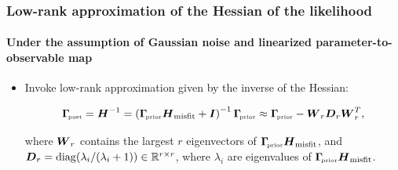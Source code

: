 \documentclass[10pt,final,xcolor=dvipsnames]{beamer}
\begin{document}
\begin{frame}
\frametitle{Low-rank approximation of the Hessian of the likelihood}

\framesubtitle{Under the assumption of Gaussian noise and linearized
  parameter-to-observable map}

\begin{itemize}

\item Invoke low-rank approximation  given by the inverse of the Hessian:
  \begin{minipage}{0.9\textwidth}
  \begin{block}{}
    \[
    \boldsymbol{\Gamma}_{\!\mbox{\tiny post}} = \boldsymbol{H}^{-1} =
    \left( \boldsymbol{\Gamma}_{\!\mbox{\tiny prior}} \boldsymbol{H}_{\text{misfit}} + \boldsymbol{I} \right)^{-1} \boldsymbol{\Gamma}_{\!\mbox{\tiny prior}}
    \approx \boldsymbol{\Gamma}_{\!\mbox{\tiny prior}} - \boldsymbol{W}_r \boldsymbol{D}_r \boldsymbol{W}^T_r,
    \]
  \end{block}
  \end{minipage}

  \vspace{0.15in} where $\boldsymbol{W}_r$ contains the largest $r$
  eigenvectors of $\boldsymbol{\Gamma}_{\!\mbox{\tiny prior}} \boldsymbol{H}_{\text{misfit}}$, and $\boldsymbol{D}_r =
  \operatorname{diag}(\lambda_i/(\lambda_i +1))\in \mathbb{R}^{r \times r}$, where
  $\lambda_i$ are eigenvalues of $\boldsymbol{\Gamma}_{\!\mbox{\tiny prior}} \boldsymbol{H}_{\text{misfit}}$.


\end{itemize}
\end{frame}
\end{document}
